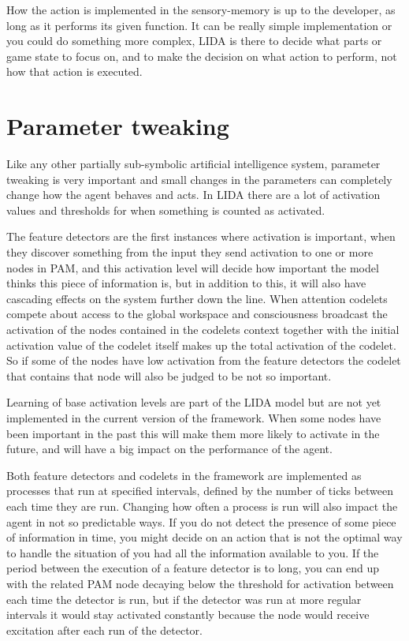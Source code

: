 How the action is implemented in the sensory-memory is up to the developer, as long as it performs its given function. It can be really simple implementation or you could do something more complex, LIDA is there to decide what parts or game state to focus on, and to make the decision on what action to perform, not how that action is executed.

\section{Parameter tweaking}
Like any other partially sub-symbolic artificial intelligence system, parameter tweaking is very important and small changes in the parameters can completely change how the agent behaves and acts. In LIDA there are a lot of activation values and thresholds for when something is counted as activated. 

The feature detectors are the first instances where activation is important, when they discover something from the input they send activation to one or more nodes in PAM, and this activation level will decide how important the model thinks this piece of information is, but in addition to this, it will also have cascading effects on the system further down the line. When attention codelets compete about access to the global workspace and consciousness broadcast the activation of the nodes contained in the codelets context together with the initial activation value of the codelet itself makes up the total activation of the codelet. So if some of the nodes have low activation from the feature detectors the codelet that contains that node will also be judged to be not so important. 

Learning of base activation levels are part of the LIDA model but are not yet implemented in the current version of the framework. When some nodes have been important in the past this will make them more likely to activate in the future, and will have a big impact on the performance of the agent. 

Both feature detectors and codelets in the framework are implemented as processes that run at specified intervals, defined by the number of ticks between each time they are run. Changing how often a process is run will also impact the agent in not so predictable ways. If you do not detect the presence of some piece of information in time, you might decide on an action that is not the optimal way to handle the situation of you had all the information available to you. If the period between the execution of a feature detector is to long, you can end up with the related PAM node decaying below the threshold for activation between each time the detector is run, but if the detector was run at more regular intervals it would stay activated constantly because the node would receive excitation after each run of the detector. 

